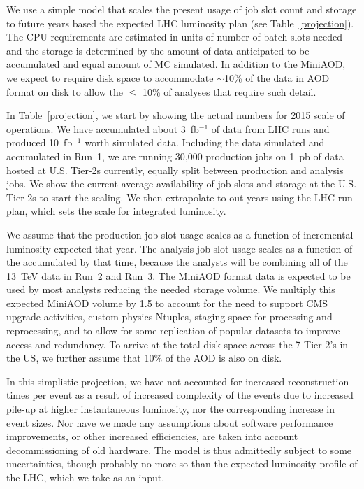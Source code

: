 \documentclass[11pt,a4paper]{article}
\begin{document}
We use a simple model that scales the present usage of job slot count 
and storage to future years based the expected LHC  luminosity plan 
(see Table~\ref{projection}).
The CPU requirements are estimated in units of number of 
batch slots needed and the storage is determined by the amount of
data anticipated to be accumulated and equal amount of MC simulated.
In addition to the MiniAOD, we expect to require disk space to accommodate 
$\sim$10\% of the data in AOD format on disk to allow the $\le$ 10\% of 
analyses that require such detail.

In Table~\ref{projection}, we start by showing the actual numbers for
2015 scale of operations.  We have accumulated about 3~fb$^{-1}$
of data from LHC runs and produced 10~fb$^{-1}$ worth simulated data.
Including the data simulated and accumulated in Run~1, we are running
30,000 production jobs on 1~pb of data hosted at U.S. Tier-2s currently,
equally split between production and analysis jobs.  We show the
current average availability of job slots and storage at the U.S. Tier-2s 
to start the scaling.  We then extrapolate to out years using the
LHC run plan, which sets the scale for integrated luminosity.

We assume that the production job slot usage scales as a function of 
incremental luminosity expected that year.  The analysis job slot usage
scales as a function of the accumulated by that time, because the analysts
will be combining all of the 13~TeV data in Run~2 and Run~3.
The MiniAOD format data is expected to be
used by most analysts reducing the needed storage volume.  
We multiply this expected MiniAOD volume by 1.5 to account for the
need to support CMS upgrade activities, custom physics Ntuples, staging space for processing and reprocessing, and to allow for some
replication of popular datasets to improve access and redundancy.
To arrive at the total disk space across the 7 Tier-2's in the US, we further assume that 10\% of the AOD is also on disk.

In this simplistic projection, we have not accounted for increased reconstruction times per event
as a result of increased complexity of the events due to increased pile-up
at higher instantaneous luminosity, nor the corresponding increase in event sizes.
Nor have we made any assumptions about software performance improvements, or other increased efficiencies,
are taken into account decommissioning of old hardware. The model is thus admittedly subject to some uncertainties,
though probably no more so than the expected luminosity profile of the LHC, which we take as an input.
\end{document}
